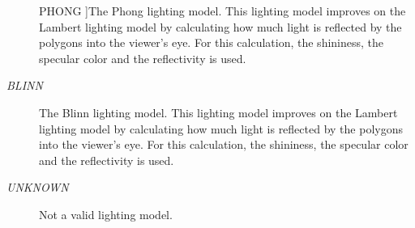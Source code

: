 \begin{Desc}
\begin{description}
{\hypertarget{classFCDEffectStandard_a0c8ec2fb06ea05212a4bb140f909b41dacdf2c5f91356a6c80fd8d764a433e008}{
PHONG}
\label{classFCDEffectStandard_a0c8ec2fb06ea05212a4bb140f909b41dacdf2c5f91356a6c80fd8d764a433e008}
}]The Phong lighting model. This lighting model improves on the Lambert lighting model by calculating how much light is reflected by the polygons into the viewer's eye. For this calculation, the shininess, the specular color and the reflectivity is used. \item[{\em 
\hypertarget{classFCDEffectStandard_a0c8ec2fb06ea05212a4bb140f909b41da589842bebd4c87def8bf1a65fab074f4}{
BLINN}
\label{classFCDEffectStandard_a0c8ec2fb06ea05212a4bb140f909b41da589842bebd4c87def8bf1a65fab074f4}
}]The Blinn lighting model. This lighting model improves on the Lambert lighting model by calculating how much light is reflected by the polygons into the viewer's eye. For this calculation, the shininess, the specular color and the reflectivity is used. \item[{\em 
\hypertarget{classFCDEffectStandard_a0c8ec2fb06ea05212a4bb140f909b41dac081dc5deede6d9e1a8293f556a5bcfc}{
UNKNOWN}
\label{classFCDEffectStandard_a0c8ec2fb06ea05212a4bb140f909b41dac081dc5deede6d9e1a8293f556a5bcfc}
}]Not a valid lighting model. \end{description}
\end{Desc}

